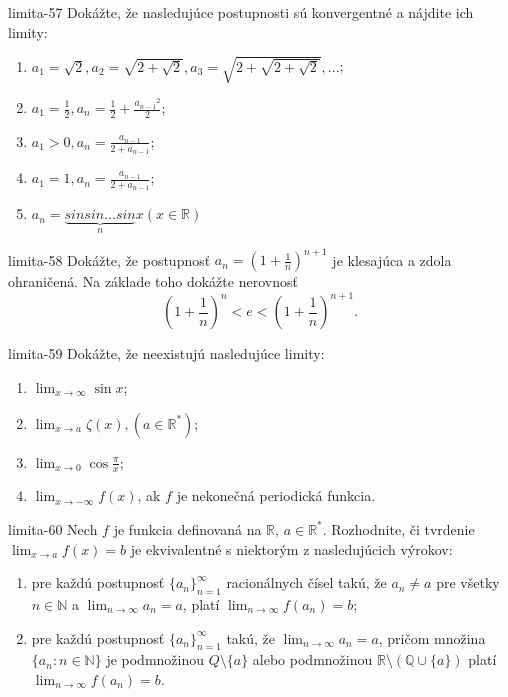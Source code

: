 \begin{defproblem}{limita-57}
Dokážte, že nasledujúce postupnosti sú konvergentné a nájdite ich limity:
\begin{enumerate}
\item $a_1=\sqrt{2}, a_2=\sqrt{2+\sqrt{2}}, a_3=\sqrt{2+\sqrt{2+\sqrt{2}}},...$;
\item $a_1=\frac{1}{2}, a_n=\frac{1}{2}+\frac{{a_{n-1}}^{2}}{2}$;
\item $a_1>0, a_n=\frac{a_{n-1}}{2+a_{n-1}}$;
\item $a_1=1, a_n=\frac{a_{n-1}}{2+a_{n-1}}$;
\item $a_n=\underbrace{sin sin ... sin}_n x (x \in \mathbb{R})$
\end{enumerate}
\end{defproblem}

\begin{defproblem}{limita-58}
Dokážte, že postupnosť $a_{n}=(1+\frac{1}{n})^{n+1}$ je klesajúca a zdola ohraničená. Na základe toho dokážte nerovnosť
$$(1+\frac{1}{n})^n<e<(1+\frac{1}{n})^{n+1}.$$
\end{defproblem}

\begin{defproblem}{limita-59}
Dokážte, že neexistujú nasledujúce limity:
\begin{multicols}{2}
\begin{enumerate}
    \item $\lim_{{x \rightarrow \infty}} \sin x$;
    \item $\lim_{{x \rightarrow a}} \zeta (x), (a \in \mathbb{R^*})$;
    \item $\lim_{{x \rightarrow 0}} \cos \frac{\pi}{x}$;
    \item $\lim_{{x \rightarrow -\infty}} f(x)$, ak $f$ je nekonečná periodická funkcia.
\end{enumerate}
\end{multicols}
\end{defproblem}

\begin{defproblem}{limita-60}
Nech $f$ je funkcia definovaná na $\mathbb{R}$, $a \in \mathbb{R^*}$. Rozhodnite, či tvrdenie $\lim_{x \rightarrow a} f(x)=b$ je ekvivalentné s niektorým z nasledujúcich výrokov:
\begin{enumerate}
\item pre každú postupnosť ${\{a_n\}}_{n=1}^\infty$ racionálnych čísel takú, že $a_n \neq a$ pre všetky $n \in \mathbb{N}$ a $\lim_{n \rightarrow \infty} a_n=a$, platí $\lim_{n \rightarrow \infty} f(a_n)=b$;
\item pre každú postupnosť ${\{a_n\}}_{n=1}^\infty$ takú, že $\lim_{n \rightarrow \infty} a_n=a$, pričom množina $\{ a_n : n\in \mathbb{N }\}$ je podmnožinou $Q \setminus \{ a\}$ alebo podmnožinou $\mathbb{R} \setminus (\mathbb{Q} \cup \{ a\})$ platí $\lim_{n \rightarrow \infty} f(a_n)=b$.
\end{enumerate}
\end{defproblem}

